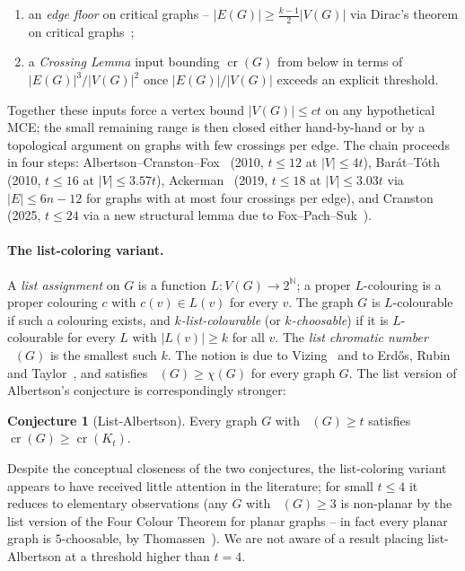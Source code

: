 \documentclass[11pt,a4paper]{article}
\theoremstyle{definition}
\newtheorem{conjecture}[theorem]{Conjecture}
\DeclareMathOperator{\crN}{cr}
\DeclareMathOperator{\chl}{\chi_{\ell}}
\newcommand{\NN}{\mathbb{N}}
\begin{document}
\begin{enumerate}
  \item an \emph{edge floor} on critical graphs --
        $|E(G)| \ge \tfrac{k-1}{2}|V(G)|$ via Dirac's theorem on
        critical graphs~\cite{Dirac1952};
  \item a \emph{Crossing Lemma} input bounding $\crN(G)$ from below
        in terms of $|E(G)|^{3}/|V(G)|^{2}$ once $|E(G)| / |V(G)|$
        exceeds an explicit threshold.
\end{enumerate}

Together these inputs force a vertex bound $|V(G)| \le c t$ on any
hypothetical MCE; the small remaining range is then closed either
hand-by-hand or by a topological argument on graphs with few
crossings per edge. The chain proceeds in four steps:
Albertson--Cranston--Fox~\cite{ACF} (2010, $t \le 12$ at
$|V| \le 4t$), Bar\'at--T\'oth~\cite{BT} (2010, $t \le 16$ at
$|V| \le 3.57t$), Ackerman~\cite{Ackerman} (2019, $t \le 18$ at
$|V| \le 3.03t$ via $|E| \le 6n - 12$ for graphs with at most four
crossings per edge), and Cranston~\cite{Cranston} (2025, $t \le 24$
via a new structural lemma due to Fox--Pach--Suk~\cite{FPS}).

\paragraph{The list-coloring variant.}
A \emph{list assignment} on $G$ is a function $L : V(G) \to 2^{\NN}$;
a proper $L$-colouring is a proper colouring $c$ with $c(v) \in L(v)$
for every $v$. The graph $G$ is $L$-colourable if such a colouring
exists, and \emph{$k$-list-colourable} (or \emph{$k$-choosable}) if
it is $L$-colourable for every $L$ with $|L(v)| \ge k$ for all $v$.
The \emph{list chromatic number} $\chl(G)$ is the smallest such $k$.
The notion is due to Vizing~\cite{Vizing} and to Erd\H{o}s, Rubin
and Taylor~\cite{ERT}, and satisfies $\chl(G) \ge \chi(G)$ for every
graph $G$. The list version of Albertson's conjecture is
correspondingly stronger:

\begin{conjecture}[List-Albertson]\label{conj:list-albertson}
Every graph $G$ with $\chl(G) \ge t$ satisfies
$\crN(G) \ge \crN(K_t)$.
\end{conjecture}

Despite the conceptual closeness of the two conjectures, the
list-coloring variant appears to have received little attention in
the literature; for small $t \le 4$ it reduces to elementary
observations (any $G$ with $\chl(G) \ge 3$ is non-planar by the
list version of the Four Colour Theorem for planar graphs --
in fact every planar graph is $5$-choosable, by
Thomassen~\cite{Thomassen}). We are not aware of a result placing
list-Albertson at a threshold higher than $t = 4$.
\end{document}

